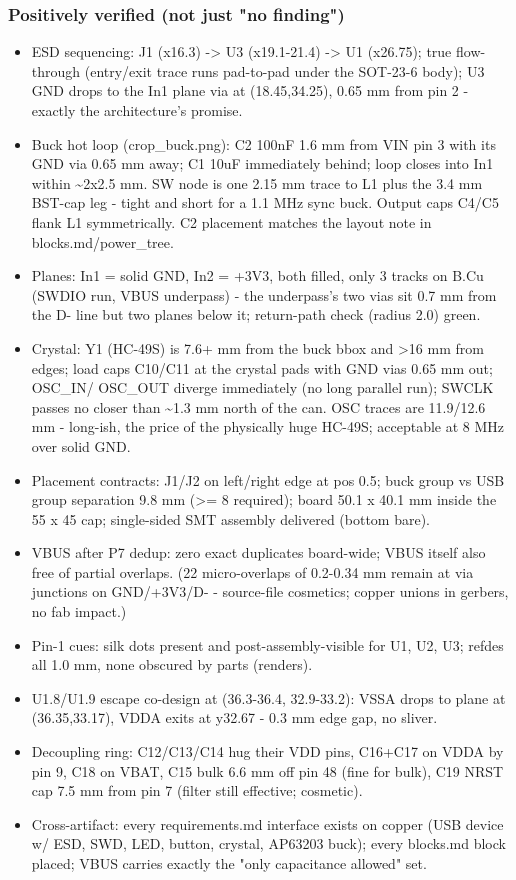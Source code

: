\documentclass[11pt,a4paper]{article}
\begin{document}
\subsubsection*{Positively verified (not just "no finding")}
\begin{itemize}
\item ESD sequencing: J1 (x16.3) -\textgreater{} U3 (x19.1-21.4) -\textgreater{} U1 (x26.75); true
flow-through (entry/exit trace runs pad-to-pad under the SOT-23-6 body);
U3 GND drops to the In1 plane via at (18.45,34.25), 0.65 mm from pin 2 -
exactly the architecture's promise.
\item Buck hot loop (crop\_buck.png): C2 100nF 1.6 mm from VIN pin 3 with its GND
via 0.65 mm away; C1 10uF immediately behind; loop closes into In1 within
\textasciitilde{}2x2.5 mm. SW node is one 2.15 mm trace to L1 plus the 3.4 mm BST-cap leg -
tight and short for a 1.1 MHz sync buck. Output caps C4/C5 flank L1
symmetrically. C2 placement matches the layout note in blocks.md/power\_tree.
\item Planes: In1 = solid GND, In2 = +3V3, both filled, only 3 tracks on B.Cu
(SWDIO run, VBUS underpass) - the underpass's two vias sit 0.7 mm from the
D- line but two planes below it; return-path check (radius 2.0) green.
\item Crystal: Y1 (HC-49S) is 7.6+ mm from the buck bbox and \textgreater{}16 mm from edges;
load caps C10/C11 at the crystal pads with GND vias 0.65 mm out; OSC\_IN/
OSC\_OUT diverge immediately (no long parallel run); SWCLK passes no closer
than \textasciitilde{}1.3 mm north of the can. OSC traces are 11.9/12.6 mm - long-ish, the
price of the physically huge HC-49S; acceptable at 8 MHz over solid GND.
\item Placement contracts: J1/J2 on left/right edge at pos 0.5; buck group vs
USB group separation 9.8 mm (\textgreater{}= 8 required); board 50.1 x 40.1 mm inside
the 55 x 45 cap; single-sided SMT assembly delivered (bottom bare).
\item VBUS after P7 dedup: zero exact duplicates board-wide; VBUS itself also
free of partial overlaps. (22 micro-overlaps of 0.2-0.34 mm remain at
via junctions on GND/+3V3/D- - source-file cosmetics; copper unions in
gerbers, no fab impact.)
\item Pin-1 cues: silk dots present and post-assembly-visible for U1, U2, U3;
refdes all 1.0 mm, none obscured by parts (renders).
\item U1.8/U1.9 escape co-design at (36.3-36.4, 32.9-33.2): VSSA drops to plane
at (36.35,33.17), VDDA exits at y32.67 - 0.3 mm edge gap, no sliver.
\item Decoupling ring: C12/C13/C14 hug their VDD pins, C16+C17 on VDDA by pin 9,
C18 on VBAT, C15 bulk 6.6 mm off pin 48 (fine for bulk), C19 NRST cap
7.5 mm from pin 7 (filter still effective; cosmetic).
\item Cross-artifact: every requirements.md interface exists on copper (USB
device w/ ESD, SWD, LED, button, crystal, AP63203 buck); every blocks.md
block placed; VBUS carries exactly the "only capacitance allowed" set.
\end{itemize}
\end{document}
